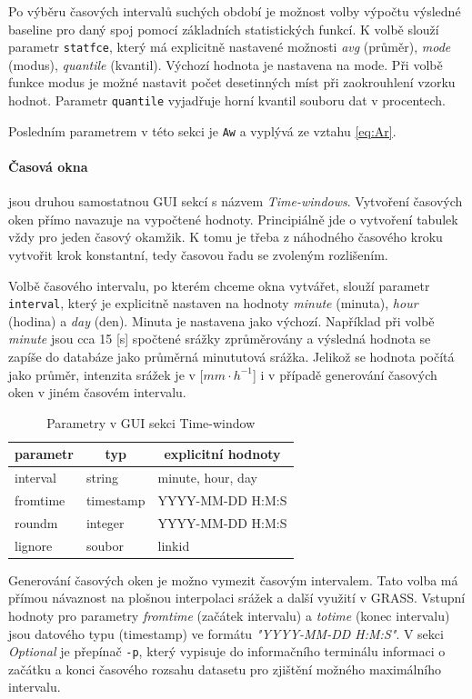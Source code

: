 \documentclass[a4paper,12pt,oneside]{report}
\begin{document}
Po výběru časových intervalů suchých období je možnost volby výpočtu výsledné baseline
pro daný spoj pomocí základních statistických funkcí. K volbě slouží
parametr \texttt{statfce}, který má explicitně nastavené možnosti
\emph{avg} (průměr), \emph{mode} (modus), \emph{quantile}
(kvantil). Výchozí hodnota je nastavena na mode. Při volbě funkce
modus je možné nastavit počet desetinných míst při zaokrouhlení vzorku
hodnot. Parametr \texttt{quantile} vyjadřuje horní kvantil souboru dat
v procentech.

Posledním parametrem v této sekci je \texttt{Aw} a vyplývá ze vztahu
\ref{eq:Ar}.


\paragraph*{Časová okna} jsou druhou samostatnou GUI sekcí s názvem
\textit{Time-windows}. Vytvoření časových oken přímo navazuje na
vypočtené hodnoty. Principiálně jde o vytvoření tabulek vždy pro jeden
časový okamžik. K tomu je třeba z náhodného časového kroku vytvořit
krok konstantní, tedy časovou řadu se zvoleným rozlišením.

Volbě časového intervalu, po kterém chceme okna vytvářet, slouží
parametr \texttt{interval}, který je explicitně nastaven na hodnoty
\emph{minute} (minuta), \emph{hour} (hodina) a \emph{day}
(den). Minuta je nastavena jako výchozí.  Například při volbě
\emph{minute} jsou cca 15 [s] spočtené srážky zprůměrovány a výsledná
hodnota se zapíše do databáze jako průměrná minututová srážka. Jelikož
se hodnota počítá jako průměr, intenzita srážek je v [$mm \cdot
h^{-1}$] i v případě generování časových oken v jiném časovém
intervalu.
\begin{table}[h]
\centering
\begin{tabular}{|lll|}
\hline
\multicolumn{1}{|c}{parametr} & \multicolumn{1}{c}{typ} & \multicolumn{1}{c|}{explicitní hodnoty} \\ \hline\hline
interval                               & string                  & minute, hour, day             \\
fromtime                               & timestamp               & YYYY-MM-DD H:M:S              \\
roundm                                 & integer                 & YYYY-MM-DD H:M:S              \\
lignore                                & soubor                  & linkid                        \\ \hline
\end{tabular}
\caption{Parametry v GUI sekci Time-window}
\label{my-label}
\end{table}
Generování časových oken je možno vymezit časovým intervalem. Tato
volba má přímou návaznost na plošnou interpolaci srážek a další
využití v GRASS. Vstupní hodnoty pro parametry \textit{fromtime}
(začátek intervalu) a \textit{totime} (konec intervalu) jsou datového
typu (timestamp) ve formátu \emph{"YYYY-MM-DD H:M:S"}. V sekci
\textit{Optional} je přepínač \texttt{-p}, který vypisuje do
informačního terminálu informaci o začátku a konci časového rozsahu
datasetu pro zjištění možného maximálního intervalu.
\end{document}
